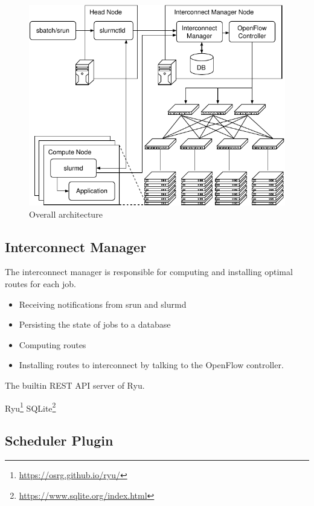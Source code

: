 \documentclass[graybox]{svmult}
\begin{document}
\begin{figure}
    \centering
    \includegraphics{architecture}
    \caption{Overall architecture}%
    \label{kt:fig:architecture}
\end{figure}

\subsection{Interconnect Manager}

The interconnect manager is responsible for computing and installing optimal
routes for each job.

\begin{itemize}
    \item Receiving notifications from srun and slurmd
    \item Persisting the state of jobs to a database
    \item Computing routes
    \item Installing routes to interconnect by talking to the OpenFlow
        controller.
\end{itemize}


The builtin REST API server of Ryu.

Ryu\footnote{\url{https://osrg.github.io/ryu/}}
SQLite\footnote{\url{https://www.sqlite.org/index.html}}

\subsection{Scheduler Plugin}
\end{document}
